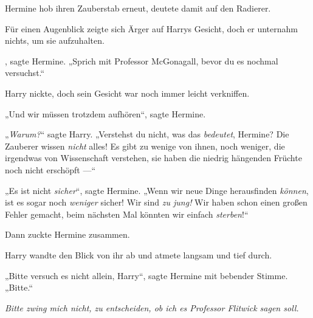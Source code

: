 Hermine hob ihren Zauberstab erneut, deutete damit auf den Radierer.

Für einen Augenblick zeigte sich Ärger auf Harrys Gesicht, doch er unternahm nichts, um sie aufzuhalten.

, sagte Hermine.
„Sprich mit Professor McGonagall, bevor du es nochmal versuchst.“

Harry nickte, doch sein Gesicht war noch immer leicht verkniffen.

„Und wir müssen trotzdem aufhören“, sagte Hermine.

„\emph{Warum?}“ sagte Harry.
„Verstehst du nicht, was das \emph{bedeutet}, Hermine? Die Zauberer wissen \emph{nicht} alles! Es gibt zu wenige von ihnen, noch weniger, die irgendwas von Wissenschaft verstehen, sie haben die niedrig hängenden Früchte noch nicht erschöpft —“

„Es ist nicht \emph{sicher}“, sagte Hermine.
„Wenn wir neue Dinge herausfinden \emph{können}, ist es sogar noch \emph{weniger} sicher! Wir sind \emph{zu jung!} Wir haben schon einen großen Fehler gemacht, beim nächsten Mal könnten wir einfach \emph{sterben}!“

Dann zuckte Hermine zusammen.

Harry wandte den Blick von ihr ab und atmete langsam und tief durch.

„Bitte versuch es nicht allein, Harry“, sagte Hermine mit bebender Stimme.
„Bitte.“

\emph{Bitte zwing mich nicht, zu entscheiden, ob ich es Professor Flitwick sagen soll.}

